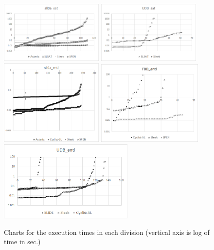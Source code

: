 \documentclass[twoside,11pt]{article}
\begin{document}
\begin{figure}
\begin{center}
\includegraphics[width=0.46\textwidth]{sll0a_sat.png}
\includegraphics[width=0.46\textwidth]{UDB_sat.png}
\includegraphics[width=0.46\textwidth]{sll0a_entl.png}
\includegraphics[width=0.47\textwidth]{FDB_entl.png}
\includegraphics[width=0.6\textwidth]{UDB_entl.png}
\end{center}
\caption{Charts for the execution times in each division (vertical axis is log of time in sec.)}
\label{fig:charts}
\end{figure}
\end{document}
